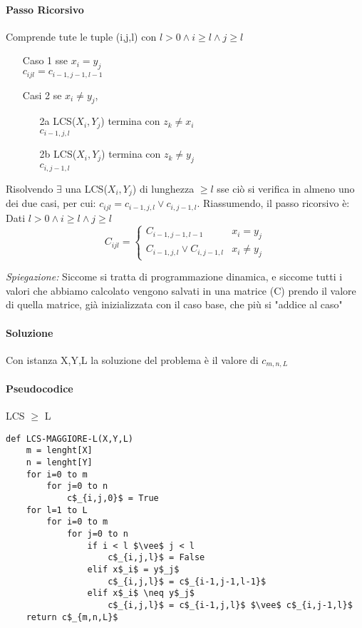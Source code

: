 \documentclass[12pt, a4paper, openany]{book}
\newcommand{\spiegazione}[1]{\begin{box_spiegazione} \small{ \emph{Spiegazione: }#1}\end{box_spiegazione}}
\begin{document}
\paragraph*{Passo Ricorsivo}
Comprende tute le tuple (i,j,l) con $l>0 \wedge i\geq l \wedge j \geq l$
	\begin{itemize}
		\item[Caso 1] sse $x_i = y_j$\\ $c_{ijl} = c_{i-1,j-1,l-1}$ %
		\item[Casi 2] se  $x_i \neq y_j$,
		\begin{itemize}
			\item[2a] LCS($X_i,Y_j$) termina con $z_k \neq x_i$ \\ $c_{i-1,j,l}$
			\item[2b] LCS($X_i,Y_j$) termina con $z_k \neq y_j$ \\ $c_{i,j-1,l}$
		\end{itemize}
	\end{itemize}
Risolvendo $\exists$ una LCS($X_i,Y_j$) di lunghezza $\geq l$ sse ciò si verifica in almeno uno dei due casi, per cui:
$c_{ijl} = c_{i-1,j,l} \vee c_{i,j-1,l}$.
Riassumendo, il passo ricorsivo è:
Dati $l>0 \wedge i\geq l \wedge j \geq l$
\begin{equation}
	C_{ijl} = \begin{cases}
		C_{i-1,j-1,l-1} &  x_i = y_j\\
		C_{i-1,j,l} \vee C_{i,j-1,l} & x_i \neq y_j
	\end{cases}
\end{equation}

\spiegazione{
	Siccome si tratta di programmazione dinamica, e siccome tutti i valori che abbiamo calcolato vengono salvati in una matrice (C)
	prendo il valore di quella matrice, già inizializzata con il caso base, che più si "addice al caso"}

\paragraph*{Soluzione}
Con istanza X,Y,L la soluzione del problema è il valore di $c_{m,n,L}$

\paragraph*{Pseudocodice} LCS $\geq$ L
\begin{lstlisting}[style=small]
def LCS-MAGGIORE-L(X,Y,L)
	m = lenght[X]
	n = lenght[Y]
	for i=0 to m
		for j=0 to n
			c$_{i,j,0}$ = True
	for l=1 to L
		for i=0 to m
			for j=0 to n
				if i < l $\vee$ j < l
					c$_{i,j,l}$ = False
				elif x$_i$ = y$_j$
					c$_{i,j,l}$ = c$_{i-1,j-1,l-1}$
				elif x$_i$ \neq y$_j$
					c$_{i,j,l}$ = c$_{i-1,j,l}$ $\vee$ c$_{i,j-1,l}$
	return c$_{m,n,L}$
\end{lstlisting}
\end{document}
